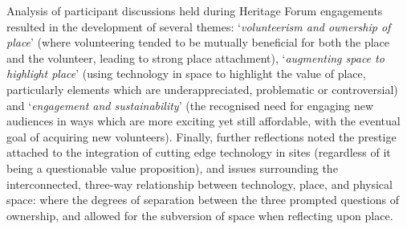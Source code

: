 Analysis of participant discussions held during Heritage Forum engagements resulted in the development of several themes: `\textit{volunteerism and ownership of place}' (where volunteering tended to be mutually beneficial for both the place and the volunteer, leading to strong place attachment), `\textit{augmenting space to highlight place}' (using technology in space to highlight the value of place, particularly elements which are underappreciated, problematic or controversial) and `\textit{engagement and sustainability}' (the recognised need for engaging new audiences in ways which are more exciting yet still affordable, with the eventual goal of acquiring new volunteers). Finally, further reflections noted the prestige attached to the integration of cutting edge technology in sites (regardless of it being a questionable value proposition), and issues surrounding the interconnected, three-way relationship between technology, place, and physical space: where the degrees of separation between the three prompted questions of ownership, and allowed for the subversion of space when reflecting upon place.
